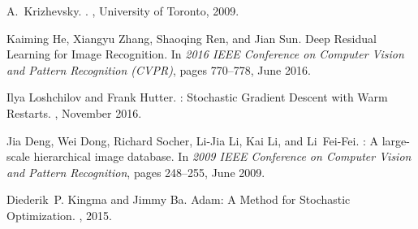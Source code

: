 \documentclass{article}
\begin{document}
\begin{thebibliography}{10}
  A.~Krizhevsky.
  .
  , University of Toronto, 2009.
  
  Kaiming He, Xiangyu Zhang, Shaoqing Ren, and Jian Sun.
  \newblock Deep {{Residual Learning}} for {{Image Recognition}}.
  \newblock In {\em 2016 {{IEEE Conference}} on {{Computer Vision}} and {{Pattern
    Recognition}} ({{CVPR}})}, pages 770--778, June 2016.
  
  Ilya Loshchilov and Frank Hutter.
  : Stochastic {{Gradient Descent}} with {{Warm Restarts}}.
  , November
    2016.
  
  Jia Deng, Wei Dong, Richard Socher, Li-Jia Li, Kai Li, and Li~{Fei-Fei}.
  : A large-scale hierarchical image database.
  \newblock In {\em 2009 {{IEEE Conference}} on {{Computer Vision}} and {{Pattern
    Recognition}}}, pages 248--255, June 2009.
  
  Diederik~P. Kingma and Jimmy Ba.
  \newblock Adam: A {{Method}} for {{Stochastic Optimization}}.
  , 2015.
  
\end{thebibliography}
  


\end{document}
